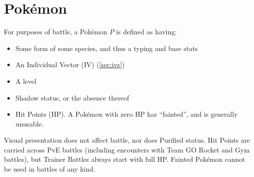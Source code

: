 \chapter{Pokémon}
\label{chap:pokemon}
For purposes of battle, a Pokémon $P$ is defined as having:
\begin{itemize}
\item Some form of some species, and thus a typing and base stats
\item An Individual Vector (IV) (\autoref{sec:ivs})
\item A level
\item Shadow status, or the absence thereof
\item Hit Points (HP). A Pokémon with zero HP has ``fainted'', and is generally unusable.
\end{itemize}
Visual presentation does not affect battle, nor does Purified status.
Hit Points are carried across PvE battles (including encounters with
  Team GO Rocket and Gym battles), but Trainer Battles always start with full HP\@.
Fainted Pokémon cannot be used in battles of any kind.

